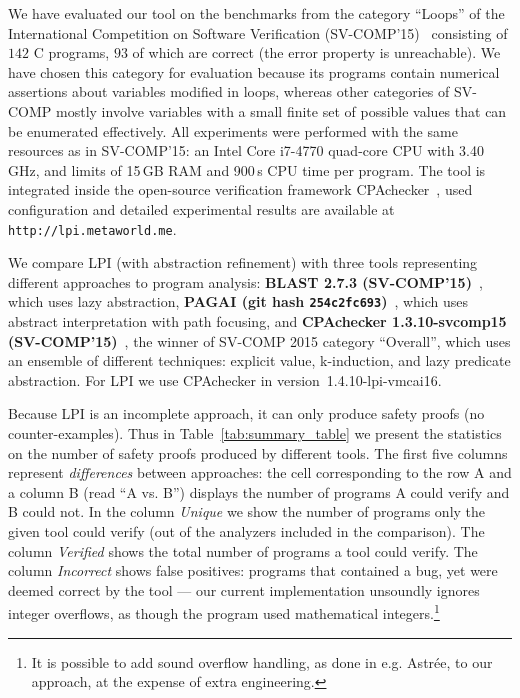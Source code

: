 \documentclass{llncs}
\begin{document}
We have evaluated our tool on the benchmarks from the category ``Loops''
of the International Competition on Software Verification (SV-COMP'15)~\cite{svcomp15}
consisting of $142$ C programs, $93$ of which are correct (the error property is
unreachable).
We have chosen this category for evaluation because
its programs contain numerical assertions about variables modified in loops,
whereas other categories of SV-COMP
mostly involve variables with a small finite set of possible values
that can be enumerated effectively.
All experiments were performed
with the same resources as in SV-COMP'15:
an Intel Core i7-4770 quad-core CPU with 3.40\,GHz,
and limits of 15\,GB RAM and 900\,s CPU time per program.
The tool is integrated inside the open-source verification framework
CPAchecker~\cite{cpachecker},
used configuration and detailed experimental results are available at
\texttt{http://lpi.metaworld.me}.

We compare LPI (with abstraction refinement) with three tools
representing different approaches to program analysis:
    \textbf{BLAST 2.7.3 (SV-COMP'15)}~\cite{blast_svcomp}, which uses lazy abstraction,
    \textbf{PAGAI (git hash \texttt{254c2fc693})}~\cite{pagai}, which uses abstract interpretation with path
        focusing, and
    \textbf{CPAchecker 1.3.10-svcomp15 (SV-COMP'15)}~\cite{cpachecker}, the winner of SV-COMP
    2015 category ``Overall'',
        which uses an ensemble of different techniques: explicit value, k-induction, and
        lazy predicate abstraction.
For LPI we use CPAchecker in version~1.4.10-lpi-vmcai16.

Because LPI is an incomplete approach, it can only produce safety proofs
(no counter-examples).
Thus in Table~\ref{tab:summary_table} we present the
statistics on the number of safety proofs produced by different tools.
The first five columns represent \emph{differences} between
approaches: the cell corresponding to the row A and a column B (read ``A vs.
B'') displays the number of programs A could verify and B could not.
In the column \emph{Unique} we show the number of programs only the given tool
could verify (out of the analyzers included in the comparison).
The column \emph{Verified} shows the total number of programs a tool could
verify.
The column \emph{Incorrect} shows false positives: programs that contained a
bug, yet were deemed correct by the tool --- our current implementation unsoundly ignores integer overflows, as though the program used mathematical integers.\footnote{It is possible to add sound overflow handling, as done in e.g. Astr\'ee, to our
approach, at the expense of extra engineering.}
\end{document}
